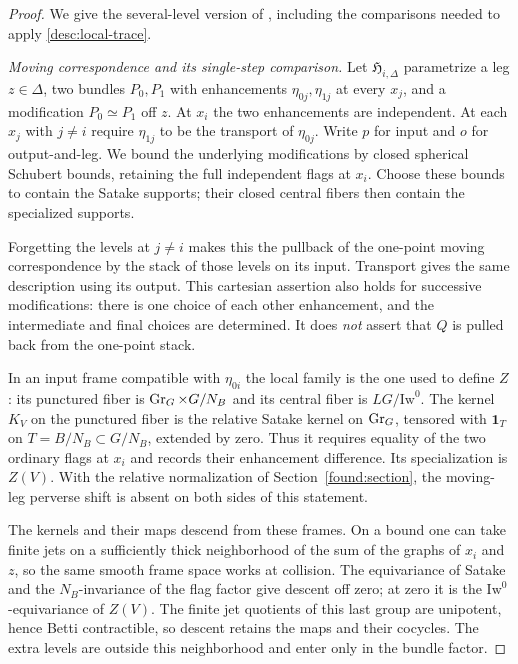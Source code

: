 \begin{proof}
We give the several-level version of \cite[Lemma~7.4]{CT}, including
the comparisons needed to apply \eqref{desc:local-trace}.

\emph{Moving correspondence and its single-step comparison.}
Let $\mathfrak H_{i,\Delta}$ parametrize a leg $z\in\Delta$, two
bundles $P_0,P_1$ with enhancements $\eta_{0j},\eta_{1j}$ at every
$x_j$, and a modification $P_0\simeq P_1$ off $z$.  At $x_i$ the two
enhancements are independent.  At each $x_j$ with $j\ne i$ require
$\eta_{1j}$ to be the transport of $\eta_{0j}$.  Write $p$ for input
and $o$ for output-and-leg.  We bound the underlying modifications
by closed spherical Schubert bounds, retaining the full independent
flags at $x_i$.  Choose these bounds to contain the Satake supports;
their closed central fibers then contain the specialized supports.

Forgetting the levels at $j\ne i$ makes this the pullback of the
one-point moving correspondence by the stack of those levels on
its input.  Transport gives the same description using its output.
This cartesian assertion also holds for successive modifications:
there is one choice of each other enhancement, and the intermediate
and final choices are determined.  It does \emph{not} assert that
$Q$ is pulled back from the one-point stack.

In an input frame compatible with $\eta_{0i}$ the local family is
the one used to define $Z$: its punctured fiber is
$\operatorname{Gr}_G\times G/N_B$ and its central fiber is $LG/\mathrm{Iw}^0$.
The kernel $K_V$ on the punctured fiber is the relative Satake
kernel on $\operatorname{Gr}_G$, tensored with $\mathbf1_T$ on
$T=B/N_B\subset G/N_B$, extended by zero.  Thus it requires equality
of the two ordinary flags at $x_i$ and records their enhancement
difference.  Its specialization is $Z(V)$.  With the relative
normalization of Section~\ref{found:section}, the moving-leg
perverse shift is absent on both sides of this statement.

The kernels and their maps descend from these frames.  On a bound
one can take finite jets on a sufficiently thick neighborhood of
the sum of the graphs of $x_i$ and $z$, so the same smooth frame
space works at collision.  The equivariance of Satake and the
$N_B$-invariance of the flag factor give descent off zero; at zero
it is the $\mathrm{Iw}^0$-equivariance of $Z(V)$.  The finite jet
quotients of this last group are unipotent, hence Betti contractible,
so descent retains the maps and their cocycles.  The extra levels
are outside this neighborhood and enter only in the bundle factor.


\end{proof}

